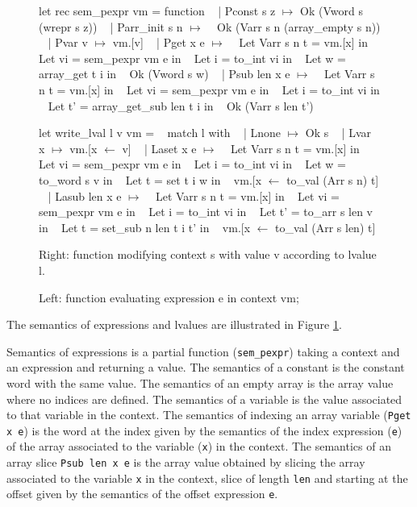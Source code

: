 \documentclass{article}
\begin{document}
\begin{figure}[p] %
\obeylines\obeyspaces\ttfamily%
\begin{minipage}{0.52\textwidth}
let rec sem\_pexpr vm = function
~ | Pconst s z \(\mapsto\) Ok (Vword s (wrepr s z))
~ | Parr\_init s n \(\mapsto\)
~   Ok (Varr s n (array\_empty s n))
~ | Pvar v \(\mapsto\) vm.[v]
~ | Pget x e \(\mapsto\)
~   Let Varr s n t = vm.[x] in
~   Let vi = sem\_pexpr vm e in
~   Let i = to\_int vi in
~   Let w = array\_get t i in
~   Ok (Vword s w)
~ | Psub len x e \(\mapsto\)
~   Let Varr s n t = vm.[x] in
~   Let vi = sem\_pexpr vm e in
~   Let i = to\_int vi in
~   Let t' = array\_get\_sub len t i in
~   Ok (Varr s len t')
\end{minipage}\hfill\vline\hfill\begin{minipage}{0.45\textwidth}
let write\_lval l v vm =
~ match l with
~ | Lnone \(\mapsto\) Ok s
~ | Lvar x \(\mapsto\) vm.[x \(\gets\) v]
~ | Laset x e \(\mapsto\)
~   Let Varr s n t = vm.[x] in
~   Let vi = sem\_pexpr vm e in
~   Let i = to\_int vi in
~   Let w = to\_word s v in
~   Let t = set t i w in
~   vm.[x \(\gets\) to\_val (Arr s n) t]
~ | Lasub len x e \(\mapsto\)
~   Let Varr s n t = vm.[x] in
~   Let vi = sem\_pexpr vm e in
~   Let i = to\_int vi in
~   Let t' = to\_arr s len v in 
~   Let t = set\_sub n len t i t' in
~   vm.[x \(\gets\) to\_val (Arr s len) t]
\end{minipage}\normalfont%
\caption{Left: function evaluating expression e in context vm;}\vspace{-0.8\baselineskip}\center
Right: function modifying context s with value v according to lvalue l.\label{fig:semelv}
\end{figure}

The semantics of expressions and lvalues are illustrated in Figure
\ref{fig:semelv}.

Semantics of expressions is a partial function (\texttt{sem\_pexpr}) taking a
context and an expression and returning a value. The semantics of a constant is
the constant word with the same value. The semantics of an empty array is the
array value where no indices are defined. The semantics of a variable is the
value associated to that variable in the context. The semantics of indexing an
array variable (\texttt{Pget x e}) is the word at the index given by the
semantics of the index expression (\texttt{e}) of the array associated to the
variable (\texttt{x}) in the context. The semantics of an array slice
\texttt{Psub len x e} is the array value obtained by slicing the array
associated to the variable \texttt{x} in the context, slice of length
\texttt{len} and starting at the offset given by the semantics of the offset
expression \texttt{e}.
\end{document}

